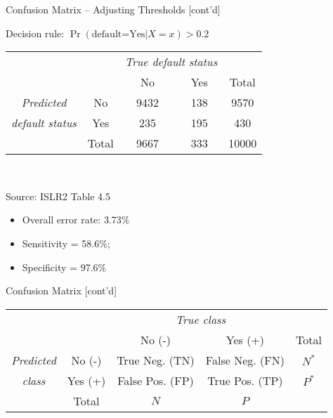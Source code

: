 \documentclass[ignorenonframetext,xcolor=x11names]{beamer}
\begin{document}
\begin{frame}{Confusion Matrix -- Adjusting Thresholds \small [cont'd]}
\begin{block}{}
\begin{center}
\renewcommand{\arraystretch}{1.25}

Decision rule: $\Pr(\text{default=Yes} | X=x) > 0.2$ \\ \vspace{2mm}
\begin{tabular}{cc|cc|c} \hline
     & & \multicolumn{2}{c|}{\emph{True default status}} \\
     & & No & Yes & Total \\ \hline
\emph{Predicted} & No & 9432 & 138 & 9570 \\ 
\emph{default status} & Yes & 235 & 195 & 430 \\ \hline
     & Total & 9667 & 333 & 10000 \\ \hline
\end{tabular} \\
\end{center}

\scriptsize Source: ISLR2 Table 4.5
\end{block}

\begin{itemize}
  \item Overall error rate: 3.73\% 
  \item Sensitivity = 58.6\%;
  \item Specificity = 97.6\%
\end{itemize}
\end{frame}

\begin{frame}{Confusion Matrix \small [cont'd]}
\begin{block}{}
\small
\begin{center}
\renewcommand{\arraystretch}{1.25}

\begin{tabular}{cc|cc|c} \hline
     & & \multicolumn{2}{c|}{\emph{True class}} \\
     & & No (-) & Yes (+) & Total \\ \hline
\emph{Predicted} & No (-) & True Neg. (TN) & False Neg. (FN) & $N^*$ \\ 
\emph{class} & Yes (+) & False Pos. (FP) & True Pos. (TP) & $P^*$ \\ \hline
     & Total & $N$ & $P$ &  \\ \hline
\end{tabular} \\
\end{center}
\end{block}
\end{frame}
\end{document}
